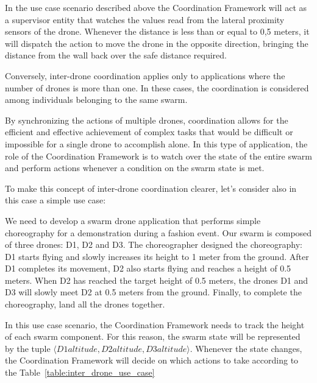 In the use case scenario described above the Coordination Framework will act as a supervisor entity that watches the values read from the lateral proximity sensors of the drone. 
Whenever the distance is less than or equal to 0,5 meters, it will dispatch the action to move the drone in the opposite direction, bringing the distance from the wall back over the safe distance required.

Conversely, inter-drone coordination applies only to applications where the number of drones is more than one.
In these cases, the coordination is considered among individuals belonging to the same swarm.

By synchronizing the actions of multiple drones, coordination allows for the efficient and effective achievement of complex tasks that would be difficult or impossible for a single drone to accomplish alone. 
In this type of application, the role of the Coordination Framework is to watch over the state of the entire swarm and perform actions whenever a condition on the swarm state is met.

To make this concept of inter-drone coordination clearer, let's consider also in this case a simple use case:

\begin{displayquote}
    We need to develop a swarm drone application that performs simple choreography for a demonstration during a fashion event. 
    Our swarm is composed of three drones: D1, D2 and D3. 
    The choreographer designed the choreography: D1 starts flying and slowly increases its height to 1 meter from the ground. 
    After D1 completes its movement, D2 also starts flying and reaches a height of 0.5 meters. 
    When D2 has reached the target height of 0.5 meters, the drones D1 and D3 will slowly meet D2 at 0.5 meters from the ground. 
    Finally, to complete the choreography, land all the drones together.
\end{displayquote}

In this use case scenario, the Coordination Framework needs to track the height of each swarm component.
For this reason, the swarm state will be represented by the tuple \(\langle D1 altitude, D2 altitude, D3altitude \rangle\). 
Whenever the state changes, the Coordination Framework will decide on which actions to take according to the Table~\ref{table:inter_drone_use_case}

